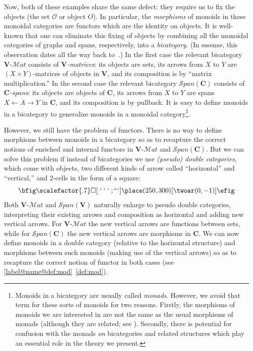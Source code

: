 \documentclass{tac}
\makeatletter
\newcommand{\V}{\ensuremath{\mathbf{V}}}
\newcommand{\C}{\ensuremath{\mathbf{C}}}
\newcommand{\mb}[1]{{\mathbf{#1}}}
\newcommand{\mat}[1]{\mathbf{#1}\mbox{-}\mathcal{M}\mathit{at}}
\newcommand{\Span}[1]{\mathcal{S}\mathit{pan}(\mb{#1})}
\numberwithin{equation}{section}
\def\autoref#1{\ref*{label@name@#1}~\ref{#1}}
\def\autoref#1{\ref{label@name@#1}~\ref{#1}}
\makeatother
\begin{document}
Now, both of these examples share the same defect: they require us to
fix the objects (the set $\mathcal{O}$ or object $O$).  In particular,
the \emph{morphisms} of monoids in these monoidal categories are
functors which are the identity on objects.  It is well-known that one
can eliminate this fixing of objects by combining all the monoidal
categories of graphs and spans, respectively, into a \emph{bicategory}.
(In essense, this observation dates all the way back to~\cite{benabou:bicats}.)
In the first case
the relevant bicategory $\mat{V}$ consists of \emph{\V-matrices}: its
objects are sets, its arrows from $X$ to $Y$ are $(X\times Y)$-matrices
of objects in \V, and its composition is by ``matrix multiplication.''
In the second case the relevant bicategory $\Span{C}$ consists of
\emph{\C-spans}: its objects are objects of \C, its arrows from $X$
to $Y$ are spans $X\leftarrow A\rightarrow Y$ in \C, and its
composition is by pullback.  It is easy to define monoids in a
bicategory to generalize monoids in a monoidal
category\footnote{Monoids in a bicategory are usually called
  \emph{monads}.  However, we avoid that term for these sorts of
  monoids for two reasons.  Firstly, the morphisms of monoids we are
  interested in are not the same as the usual morphisms of monads
  (although they are related; see \cite[\S2.3--2.4]{ls:ftm2}).
  Secondly, there is potential for
  confusion with the monads \emph{on} bicategories and related
  structures which play an essential role in the theory we present.}.

However, we still have the problem of functors.  There is no way to
define morphisms between monoids in a bicategory so as to recapture
the correct notions of enriched and internal functors in $\mat{V}$ and
$\Span{C}$.  But we can solve this problem if instead of bicategories
we use \emph{(pseudo) double categories}, which come with objects, two
different kinds of arrow called ``horizontal'' and ``vertical,'' and
2-cells in the form of a square:
\[\bfig\scalefactor{.7}\square[\;`\;`\;`\;;```] \place(250,300)[\twoar(0,-1)]\efig\]
Both $\mat{V}$ and $\Span{V}$ naturally enlarge to pseudo double
categories, interpreting their existing arrows and composition as
horizontal and adding new vertical arrows.   For $\mat{V}$ the new
vertical arrows are functions between sets, while for $\Span{C}$ the
new vertical arrows are morphisms in \C.  We can now define monoids in
a double category (relative to the horizontal structure) and morphisms
between such monoids (making use of the vertical arrows) so as to
recapture the correct notion of functor in both cases (see
\autoref{def:mod}).
\end{document}
